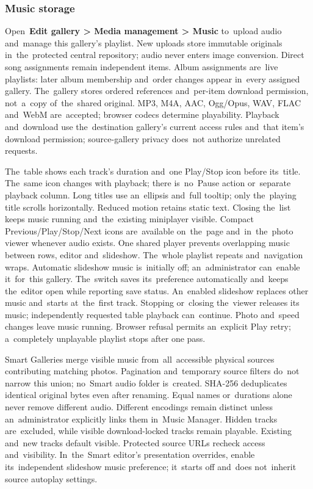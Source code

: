 \documentclass[11pt,a4paper]{article}
\newcommand{\filepath}[1]{\path{#1}}
\newcommand{\ui}[1]{\textbf{#1}}
\begin{document}
\subsubsection{Music storage}

Open~\ui{Edit gallery > Media management > Music} to~upload audio and~manage
this gallery's
playlist. New uploads store immutable originals in~the~protected central
\filepath{data/music/} repository; audio never enters image conversion.
Direct song assignments remain independent items. Album assignments are~live
playlists: later album membership and~order changes appear in~every assigned
gallery. The~gallery stores ordered references and~per-item download permission,
not~a~copy of~the~shared original. MP3, M4A, AAC,
Ogg/Opus, WAV, FLAC and~WebM are~accepted; browser codecs determine
playability. Playback and~download use the~destination gallery's current access
rules and~that item's download permission; source-gallery privacy does~not
authorize unrelated requests.

The~table shows each track's duration and~one Play/Stop icon before
its~title. The~same icon changes with playback; there is~no~Pause action
or~separate playback column. Long titles use an~ellipsis and~full tooltip;
only the~playing title scrolls horizontally. Reduced motion retains static
text. Closing the~list keeps music running and~the~existing miniplayer
visible. Compact
Previous/Play/Stop/Next icons are~available on~the~page and~in~the~photo viewer
whenever audio exists. One shared player prevents overlapping music between
rows, editor and~slideshow. The~whole playlist repeats and~navigation wraps.
Automatic slideshow music is~initially off; an~administrator can~enable
it~for~this gallery. The~switch saves its~preference automatically and~keeps
the~editor open while reporting save status. An~enabled slideshow replaces
other music and~starts at~the~first track. Stopping or~closing the~viewer
releases its music;
independently requested table playback can~continue. Photo and~speed changes
leave music running. Browser refusal permits an~explicit Play retry;
a~completely unplayable playlist stops after one pass.

Smart Galleries merge visible music from~all~accessible physical sources
contributing matching photos. Pagination and~temporary source filters do~not
narrow this union; no~Smart audio folder is~created. SHA-256 deduplicates
identical original bytes even after renaming. Equal names or~durations alone
never remove different audio. Different encodings remain distinct unless
an~administrator explicitly links them in~Music Manager. Hidden tracks
are~excluded, while visible download-locked
tracks remain playable. Existing and~new tracks default visible. Protected
source URLs recheck access and~visibility. In~the~Smart editor's presentation
overrides, enable its~independent slideshow music preference; it~starts off
and~does not~inherit source autoplay settings.
\end{document}
